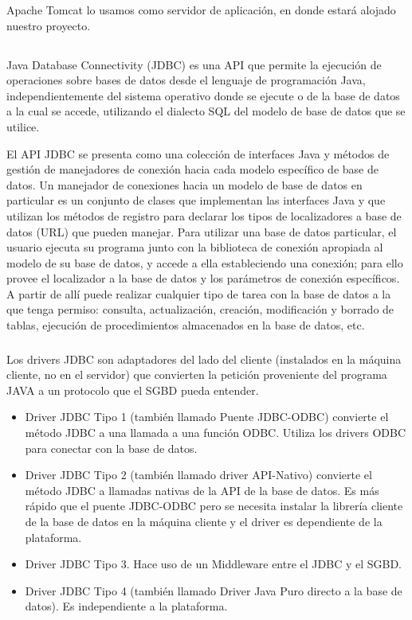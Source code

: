 \documentclass[10pt,a4paper]{article}
\begin{document}
Apache Tomcat lo usamos como servidor de aplicación, en donde estará alojado nuestro proyecto.

\subsection{\color{colorESCOM}{JDBC}}
Java Database Connectivity (JDBC) es una API que permite la ejecución de operaciones sobre bases de datos desde el lenguaje de programación Java, independientemente del sistema operativo donde se ejecute o de la base de datos a la cual se accede, utilizando el dialecto SQL del modelo de base de datos que se utilice.

El API JDBC se presenta como una colección de interfaces Java y métodos de gestión de manejadores de conexión hacia cada modelo específico de base de datos. Un manejador de conexiones hacia un modelo de base de datos en particular es un conjunto de clases que implementan las interfaces Java y que utilizan los métodos de registro para declarar los tipos de localizadores a base de datos (URL) que pueden manejar. Para utilizar una base de datos particular, el usuario ejecuta su programa junto con la biblioteca de conexión apropiada al modelo de su base de datos, y accede a ella estableciendo una conexión; para ello provee el localizador a la base de datos y los parámetros de conexión específicos. A partir de allí puede realizar cualquier tipo de tarea con la base de datos a la que tenga permiso: consulta, actualización, creación, modificación y borrado de tablas, ejecución de procedimientos almacenados en la base de datos, etc.

\subsubsection{\color{colorESCOM}{Driver JDBC}}
Los drivers JDBC son adaptadores del lado del cliente (instalados en la máquina cliente, no en el servidor) que convierten la petición proveniente del programa JAVA a un protocolo que el SGBD pueda entender.
\begin{itemize}
    \item Driver JDBC Tipo 1 (también llamado Puente JDBC-ODBC) convierte el método JDBC a una llamada a una función ODBC. Utiliza los drivers ODBC para conectar con la base de datos.
    \item Driver JDBC Tipo 2 (también llamado driver API-Nativo) convierte el método JDBC a llamadas nativas de la API de la base de datos. Es más rápido que el puente JDBC-ODBC pero se necesita instalar la librería cliente de la base de datos en la máquina cliente y el driver es dependiente de la plataforma.
    \item Driver JDBC Tipo 3. Hace uso de un Middleware entre el JDBC y el SGBD.
    \item Driver JDBC Tipo 4 (también llamado Driver Java Puro directo a la base de datos). Es independiente a la plataforma.
\end{itemize}
\end{document}
